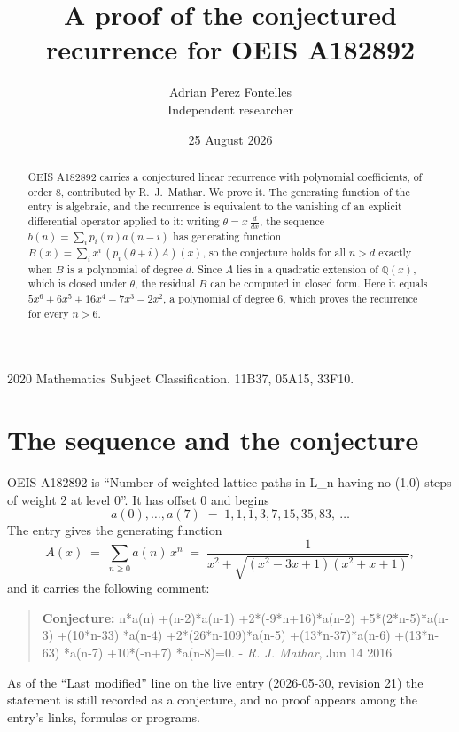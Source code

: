 \documentclass[11pt,a4paper]{article}
\title{A proof of the conjectured recurrence for OEIS A182892}
\author{Adrian Perez Fontelles\\ \small Independent researcher}
\date{25 August 2026}
\theoremstyle{plain}
\theoremstyle{definition}
\begin{document}
\maketitle

\begin{abstract}
OEIS A182892 carries a conjectured linear recurrence with polynomial coefficients, of
order 8, contributed by R.~J.~Mathar. We prove it. The generating function of the
entry is algebraic, and the recurrence is equivalent to the vanishing of an explicit
differential operator applied to it: writing $\theta=x\,\frac{d}{dx}$, the sequence
$b(n)=\sum_{i}p_{i}(n)a(n-i)$ has generating function
$B(x)=\sum_{i}x^{i}\,(p_{i}(\theta+i)A)(x)$, so the conjecture holds for all $n>d$ exactly
when $B$ is a polynomial of degree $d$. Since $A$ lies in a quadratic extension of
$\mathbb{Q}(x)$, which is closed under $\theta$, the residual $B$ can be computed in
closed form. Here it equals $5 x^{6} + 6 x^{5} + 16 x^{4} - 7 x^{3} - 2 x^{2}$, a polynomial of degree $6$, which proves
the recurrence for every $n>6$.
\end{abstract}

\noindent\small 2020 Mathematics Subject Classification. 11B37, 05A15, 33F10.\normalsize

\section{The sequence and the conjecture}

OEIS A182892 is ``Number of weighted lattice paths in L\_n having no (1,0)-steps of weight 2 at level 0''. It has offset $0$ and begins
\[
a(0),\dots,a(7)\;=\;1, 1, 1, 3, 7, 15, 35, 83,\ \dots
\]
The entry gives the generating function
\begin{equation}\label{eq:gf}
A(x)\;=\;\sum_{n\ge 0} a(n)\,x^{n}\;=\;\frac{1}{x^{2} + \sqrt{\left(x^{2} - 3 x + 1\right) \left(x^{2} + x + 1\right)}} ,
\end{equation}
and it carries the following comment:
\begin{quote}\small
\textbf{Conjecture:} n*a(n) +(n-2)*a(n-1) +2*(-9*n+16)*a(n-2) +5*(2*n-5)*a(n-3) +(10*n-33) *a(n-4) +2*(26*n-109)*a(n-5) +(13*n-37)*a(n-6) +(13*n-63) *a(n-7) +10*(-n+7) *a(n-8)=0. - \emph{R. J. Mathar}, Jun 14 2016
\end{quote}
As of the ``Last modified'' line on the live entry (2026-05-30, revision 21) the
statement is still recorded as a conjecture, and no proof appears among the entry's links,
formulas or programs.
\end{document}
